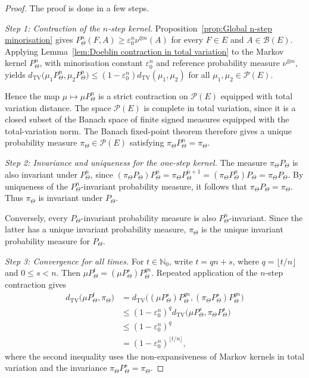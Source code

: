 \begin{proof}
The proof is done in a few steps.

\textit{Step 1: Contraction of the \(n\)-step kernel.}
Proposition~\ref{prop:Global n-step minorisation} gives \(P_\Theta^n(F,A)\geqslant\varepsilon_0^n\nu^{\otimes n}(A)\) for every \(F\in E\) and \(A\in\mathcal B(E)\). Applying Lemma~\ref{lem:Doeblin contraction in total variation} to the Markov kernel \(P_\Theta^n\), with minorisation constant \(\varepsilon_0^n\) and reference probability measure \(\nu^{\otimes n}\), yields
\(
d_{\mathrm{TV}}\bigl(\mu_1P_\Theta^n,\mu_2P_\Theta^n\bigr)
\leqslant
(1-\varepsilon_0^n)d_{\mathrm{TV}}(\mu_1,\mu_2)
\)
for all \(\mu_1,\mu_2\in\mathcal P(E)\).

Hence the map \(\mu\mapsto\mu P_\Theta^n\) is a strict contraction on \(\mathcal P(E)\) equipped with total variation distance. The space \(\mathcal P(E)\) is complete in total variation, since it is a closed subset of the Banach space of finite signed measures equipped with the total-variation norm. The Banach fixed-point theorem therefore gives a unique probability measure \(\pi_\Theta\in\mathcal P(E)\) satisfying \(\pi_\Theta P_\Theta^n=\pi_\Theta\).

\textit{Step 2: Invariance and uniqueness for the one-step kernel.}
The measure \(\pi_\Theta P_\Theta\) is also invariant under \(P_\Theta^n\), since
\(
(\pi_\Theta P_\Theta)P_\Theta^n
=
\pi_\Theta P_\Theta^{n+1}
=
(\pi_\Theta P_\Theta^n)P_\Theta
=
\pi_\Theta P_\Theta.
\)
By uniqueness of the \(P_\Theta^n\)-invariant probability measure, it follows that \(\pi_\Theta P_\Theta=\pi_\Theta\). Thus \(\pi_\Theta\) is invariant under \(P_\Theta\).

Conversely, every \(P_\Theta\)-invariant probability measure is also \(P_\Theta^n\)-invariant. Since the latter has a unique invariant probability measure, \(\pi_\Theta\) is the unique invariant probability measure for \(P_\Theta\).

\textit{Step 3: Convergence for all times.}
For \(t\in\mathbb N_0\), write \(t=qn+s\), where \(q=\lfloor t/n\rfloor\) and \(0\leqslant s<n\). Then \(\mu P_\Theta^t=(\mu P_\Theta^s)P_\Theta^{qn}\). Repeated application of the \(n\)-step contraction gives
\[
\begin{aligned}
d_{\mathrm{TV}}\bigl(\mu P_\Theta^t,\pi_\Theta\bigr)
&=
d_{\mathrm{TV}}\bigl((\mu P_\Theta^s)P_\Theta^{qn},
(\pi_\Theta P_\Theta^s)P_\Theta^{qn}\bigr)\\
&\leqslant
(1-\varepsilon_0^n)^q
d_{\mathrm{TV}}\bigl(\mu P_\Theta^s,\pi_\Theta P_\Theta^s\bigr)\\
&\leqslant
(1-\varepsilon_0^n)^q\\
&=
(1-\varepsilon_0^n)^{\lfloor t/n\rfloor},
\end{aligned}
\]
where the second inequality uses the non-expansiveness of Markov kernels in total variation and the invariance \(\pi_\Theta P_\Theta^s=\pi_\Theta\).


\end{proof}
